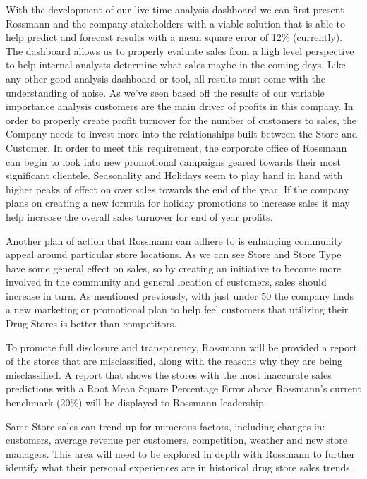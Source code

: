 \documentclass[DIV=calc, paper=a4, fontsize=11pt]{scrartcl}	 %
\begin{document}
With the development of our live time analysis dashboard we can first present 
Rossmann and the company stakeholders with a viable solution that is able to help predict and 
forecast results with a mean square error of 12\% (currently). The dashboard allows us to properly evaluate sales from a high level perspective to help internal analysts determine what sales maybe in the 
coming days. Like any other good analysis dashboard or tool, all results must come with the 
understanding of noise. As we’ve seen based off the results of our variable importance analysis 
customers are the main driver of profits in this company. In order to properly create profit 
turnover for the number of customers to sales, the Company needs to invest more into the 
relationships built between the Store and Customer. In order to meet this requirement, the 
corporate office of Rossmann can begin to look into new promotional campaigns geared 
towards their most significant clientele. Seasonality and Holidays seem to play hand in hand 
with higher peaks of effect on over sales towards the end of the year. If the company plans on 
creating a new formula for holiday promotions to increase sales it may help increase the overall 
sales turnover for end of year profits. 

Another plan of action that Rossmann can adhere to is enhancing community appeal 
around particular store locations. As we can see Store and Store Type have some general effect 
on sales, so by creating an initiative to become more involved in the community and general 
location of customers, sales should increase in turn. As mentioned previously, with just under 
50%
the company finds a new marketing or promotional plan to help feel customers that utilizing 
their Drug Stores is better than competitors.

To promote full disclosure and transparency, Rossmann will be provided a report of the stores that are misclassified, along with the reasons why they are being misclassified. A report that shows the stores with the most inaccurate sales predictions with a Root Mean Square Percentage Error above Rossmann’s current benchmark (20\%) will be displayed to Rossmann leadership.

Same Store sales can trend up for numerous factors, including changes in: customers, average revenue per customers, competition, weather and new store managers. This area will need to be explored in depth with Rossmann to further identify what their personal experiences are in historical drug store sales trends.
\end{document}
